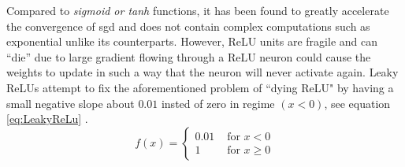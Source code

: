 Compared to \textit{sigmoid or tanh} functions, it has been found to greatly accelerate the convergence of \gls{sgd} \cite{Krizhevsky2017} and does not contain complex computations such as exponential unlike its counterparts.
However, ReLU units are fragile and can “die” due to large gradient flowing through a ReLU neuron could cause the weights to update in such a way that the neuron will never activate again. Leaky ReLUs attempt to fix the aforementioned problem of ``dying ReLU" by having a small negative slope about $0.01$ insted of zero in regime $(x<0)$, see equation \ref{eq:LeakyReLu} \cite{CS231n}.
\begin{equation}f(x)=\left\{\begin{array}{ll}
0.01 & \text { for } x<0 \\
1 & \text { for } x \geq 0
\end{array}\right.
\label{eq:LeakyReLu}
\end{equation}

